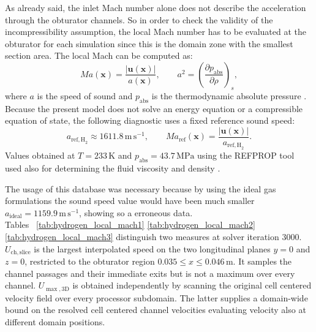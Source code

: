 As already said, the inlet Mach number alone does not describe the acceleration through the obturator channels. So in order to check the validity of the incompressibility assumption, the local Mach number has to be evaluated at the obturator for each simulation since this is the domain zone with the smallest section area.
The local Mach can be computed as:
\begin{equation}
Ma(\mathbf{x})=\frac{|\mathbf{u}(\mathbf{x})|}{a(\mathbf{x})},
\qquad
a^2=\left(\frac{\partial p_{\mathrm{abs}}}{\partial\rho}\right)_s,
\label{eq:local_mach_results}
\end{equation}
where $a$ is the speed of sound and $p_{\mathrm{abs}}$ is the thermodynamic absolute pressure \cite{anderson2017}. Because the present model does not solve an energy equation or a compressible equation of state, the following diagnostic uses a fixed reference sound speed:
\begin{equation}
a_{\mathrm{ref,H}_2} \approx 1611.8\,\mathrm{m\,s^{-1}},
\qquad Ma_{\mathrm{ref}}(\mathbf{x})=\frac{|\mathbf{u}(\mathbf{x})|}{a_{\mathrm{ref,H}_2}}.
\label{eq:hydrogen_sound_speed}
\end{equation}
Values obtained at $T=233\,\mathrm{K}$ and $p_{\mathrm{abs}}=43.7\,\mathrm{MPa}$ using the REFPROP tool used also for determining the fluid viscosity and density \cite{nist_refprop_online}.

The usage of this database was necessary because by using the ideal gas formulations the sound speed value would have been much smaller $a_{\mathrm{ideal}}=1159.9\,\mathrm{m\,s^{-1}}$, showing so a erroneous data.\\

Tables ~\ref{tab:hydrogen_local_mach1} \ref{tab:hydrogen_local_mach2} \ref{tab:hydrogen_local_mach3} distinguish two measures at solver iteration 3000. $U_{\mathrm{ch,slice}}$ is the largest interpolated speed on the two longitudinal planes $y=0$ and $z=0$, restricted to the obturator region $0.035\leq x\leq0.046\,\mathrm{m}$. It samples the channel passages and their immediate exits but is not a maximum over every channel. $U_{\max,\mathrm{3D}}$ is obtained independently by scanning the original cell centered velocity field over every processor subdomain. The latter supplies a domain-wide bound on the resolved cell centered channel velocities evaluating velocity also at different domain positions.\\


